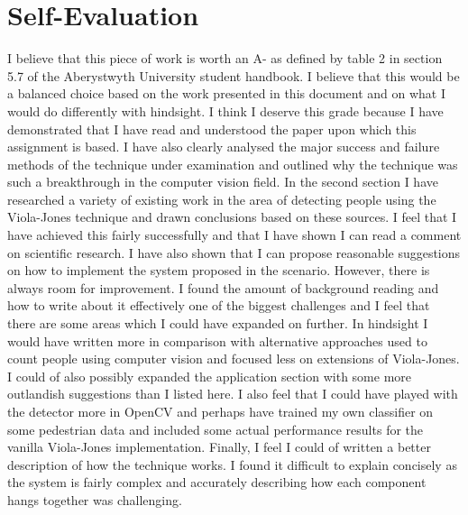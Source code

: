 \documentclass[conference]{IEEEtran}
\begin{document}
\section{Self-Evaluation} \label{sec:self-evaluation}
I believe that this piece of work is worth an A- as defined by table 2 in section 5.7 of the Aberystwyth University student handbook. I believe that this would be a balanced choice based on the work presented in this document and on what I would do differently with hindsight. I think I deserve this grade because I have demonstrated that I have read and understood the paper upon which this assignment is based. I have also clearly analysed the major success and failure methods of the technique under examination and outlined why the technique was such a breakthrough in the computer vision field. In the second section I have researched a variety of existing work in the area of detecting people using the Viola-Jones technique and drawn conclusions based on these sources. I feel that I have achieved this fairly successfully and that I have shown I can read a comment on scientific research. I have also shown that I can propose reasonable suggestions on how to implement the system proposed in the scenario. However, there is always room for improvement. I found the amount of background reading and how to write about it effectively one of the biggest challenges and I feel that there are some areas which I could have expanded on further. In hindsight I would have written more in comparison with alternative approaches used to count people using computer vision and focused less on extensions of Viola-Jones. I could of also possibly expanded the application section with some more outlandish suggestions than I listed here. I also feel that I could have played with the detector more in OpenCV and perhaps have trained my own classifier on some pedestrian data and included some actual performance results for the vanilla Viola-Jones implementation. Finally, I feel I could of written a better description of how the technique works. I found it difficult to explain concisely as the system is fairly complex and accurately describing how each component hangs together was challenging.


\end{document}
